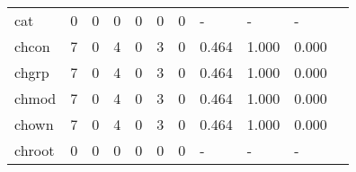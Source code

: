 \begin{longtable}{lp{1.2cm}p{1.2cm}p{1.2cm}p{1.2cm}p{1.2cm}p{1.2cm}p{1.2cm}p{1.2cm}p{1.2cm}p{1.2cm}}
cat       &                                     0 &                                                  0 &                                                0 &                                               0 &                                                0 &                                              0 &                                                  - &                                                  - &                                                  - \\
chcon     &                                     7 &                                                  0 &                                                4 &                                               0 &                                                3 &                                              0 &                                              0.464 &                                              1.000 &                                              0.000 \\
chgrp     &                                     7 &                                                  0 &                                                4 &                                               0 &                                                3 &                                              0 &                                              0.464 &                                              1.000 &                                              0.000 \\
chmod     &                                     7 &                                                  0 &                                                4 &                                               0 &                                                3 &                                              0 &                                              0.464 &                                              1.000 &                                              0.000 \\
chown     &                                     7 &                                                  0 &                                                4 &                                               0 &                                                3 &                                              0 &                                              0.464 &                                              1.000 &                                              0.000 \\
chroot    &                                     0 &                                                  0 &                                                0 &                                               0 &                                                0 &                                              0 &                                                  - &                                                  - &                                                  - \\

\end{longtable}

